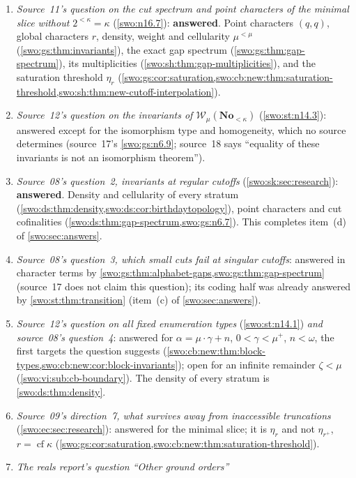 \documentclass[11pt]{article}
\theoremstyle{definition}
\theoremstyle{remark}
\newcommand{\No}{\mathbf{No}}
\newcommand{\WO}{\mathcal W}
\newcommand{\cf}{\operatorname{cf}}
\begin{document}
\begin{enumerate}[label=(\alph*)]
\item \emph{Source~11's question on the cut spectrum and point characters of
the minimal slice without $2^{<\kappa}=\kappa$} (\cref{swo:n16.7}):
\textbf{answered}. Point characters $(q,q)$, global characters $r$, density,
weight and cellularity $\mu^{<\mu}$ (\cref{swo:gs:thm:invariants}), the exact gap
spectrum (\cref{swo:gs:thm:gap-spectrum}), its multiplicities
(\cref{swo:sh:thm:gap-multiplicities}), and the saturation threshold $\eta_r$
(\cref{swo:gs:cor:saturation,swo:cb:new:thm:saturation-threshold,swo:sh:thm:new-cutoff-interpolation}).
\item \emph{Source~12's question on the invariants of
$\WO_\mu(\No_{<\kappa})$} (\cref{swo:st:n14.3}): answered except for the
isomorphism type and homogeneity, which no source determines (source~17's
\cref{swo:gs:n6.9}; source~18 says ``equality of these invariants is not an
isomorphism theorem'').
\item \emph{Source~08's question~2, invariants at regular cutoffs}
(\cref{swo:sk:sec:research}): \textbf{answered}. Density and cellularity of
every stratum (\cref{swo:ds:thm:density,swo:ds:cor:birthdaytopology}), point
characters and cut cofinalities (\cref{swo:ds:thm:gap-spectrum,swo:gs:n6.7}).
This completes item~(d) of \cref{swo:sec:answers}.
\item \emph{Source~08's question~3, which small cuts fail at singular cutoffs}:
answered in character terms by \cref{swo:gs:thm:alphabet-gaps,swo:gs:thm:gap-spectrum}
(source~17 does not claim this question); its coding half was already answered
by \cref{swo:st:thm:transition} (item~(c) of \cref{swo:sec:answers}).
\item \emph{Source~12's question on all fixed enumeration types}
(\cref{swo:st:n14.1}) \emph{and source~08's question~4}: answered for
$\alpha=\mu\cdot\gamma+n$, $0<\gamma<\mu^+$, $n<\omega$, the first targets the
question suggests (\cref{swo:cb:new:thm:block-types,swo:cb:new:cor:block-invariants}); open
for an infinite remainder $\zeta<\mu$ (\cref{swo:vi:sub:cb-boundary}). The
density of every stratum is \cref{swo:ds:thm:density}.
\item \emph{Source~09's direction~7, what survives away from inaccessible
truncations} (\cref{swo:ec:sec:research}): answered for the minimal slice; it
is $\eta_r$ and not $\eta_{r^+}$, $r=\cf\kappa$
(\cref{swo:gs:cor:saturation,swo:cb:new:thm:saturation-threshold}).
\item \emph{The reals report's question ``Other ground orders''}

\end{enumerate}
\end{document}
